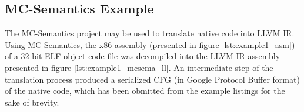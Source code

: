 
\subsection{MC-Semantics Example}
\label{app:mc-semantics_example}

The MC-Semantics project may be used to translate native code into LLVM IR. Using MC-Semantics, the x86 assembly (presented in figure \ref{lst:example1_asm}) of a 32-bit ELF object code file was decompiled into the LLVM IR assembly presented in figure \ref{lst:example1_mcsema_ll}. An intermediate step of the translation process produced a serialized CFG (in Google Protocol Buffer format) of the native code, which has been obmitted from the example listings for the sake of brevity.




